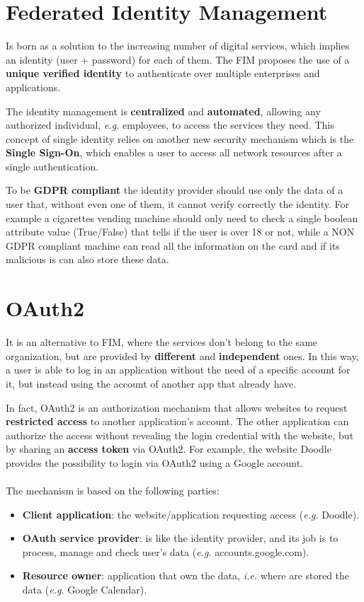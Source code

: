 \documentclass[oneside]{academica}
\begin{document}
\section{Federated Identity Management}

Is born as a solution to the increasing number of digital services, which implies an identity (user + password) for each of them.
The FIM proposes the use of a \textbf{unique verified identity} to authenticate over multiple enterprises and applications.

The identity management is \textbf{centralized} and \textbf{automated}, allowing any authorized individual, \textit{e.g.} employees, to access the services they need.
This concept of single identity relies on another new security mechanism which is the \textbf{Single Sign-On}, which enables a user to access all network resources after a single authentication.

To be \textbf{GDPR compliant} the identity provider should use only the data of a user that, without even one of them, it cannot verify correctly the identity.
For example a cigarettes vending machine should only need to check a single boolean attribute value (True/False) that tells if the user is over 18 or not, while a NON GDPR compliant machine can read all the information on the card and if its malicious is can also store these data.

\section{OAuth2}

It is an alternative to FIM, where the services don't belong to the same organization, but are provided by \textbf{different} and \textbf{independent} ones.
In this way, a user is able to log in an application without the need of a specific account for it, but instead using the account of another app that already have.

In fact, OAuth2 is an authorization mechanism that allows websites to request \textbf{restricted access} to another application’s account.
The other application can authorize the access without revealing the login credential with the website, but by sharing an \textbf{access token} via OAuth2.
For example, the website Doodle provides the possibility to login via OAuth2 using a Google account.
\\\\
The mechanism is based on the following parties:
\begin{itemize}
  \item \textbf{Client application}: the website/application requesting access (\textit{e.g.} Doodle).
  \item \textbf{OAuth service provider}: is like the identity provider, and its job is to process, manage and check user's data (\textit{e.g.} accounts.google.com).
  \item \textbf{Resource owner}: application that own the data, \textit{i.e.} where are stored the data (\textit{e.g.} Google Calendar).
\end{itemize}
\end{document}

